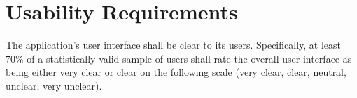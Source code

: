 \documentclass{scrreprt}
\begin{document}
\section{Usability Requirements}
The application’s user interface shall be clear to its users.
Specifically, at least 70\% of a statistically valid sample of users shall rate the overall user interface as being either very clear or clear on the following scale (very clear, clear, neutral, unclear, very unclear).

\nocite{ieee}



\end{document}
